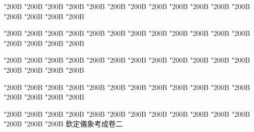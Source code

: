 \begin{正文}
\char"200B\relax{}
\char"200B\relax{}
\char"200B\relax{}
\char"200B\relax{}
\char"200B\relax{}
\char"200B\relax{}
\char"200B\relax{}
\char"200B\relax{}
\char"200B\relax{}
\char"200B\relax{}
\char"200B\relax{}
\char"200B\relax{}
\char"200B\relax{}
\char"200B\relax{}
\char"200B\relax{}
\char"200B\relax
{}\par
\end{正文}\clearpage
{}
\begin{正文}
\char"200B\relax{}
\char"200B\relax{}
\char"200B\relax{}
\char"200B\relax{}
\char"200B\relax{}
\char"200B\relax{}
\char"200B\relax{}
\char"200B\relax{}
\char"200B\relax{}
\char"200B\relax{}
\char"200B\relax{}
\char"200B\relax{}
\char"200B\relax{}
\char"200B\relax{}
\char"200B\relax{}
\char"200B\relax
{}\par
\end{正文}\clearpage
{}
\begin{正文}
\char"200B\relax{}
\char"200B\relax{}
\char"200B\relax{}
\char"200B\relax{}
\char"200B\relax{}
\char"200B\relax{}
\char"200B\relax{}
\char"200B\relax{}
\char"200B\relax{}
\char"200B\relax{}
\char"200B\relax{}
\char"200B\relax{}
\char"200B\relax{}
\char"200B\relax{}
\char"200B\relax{}
\char"200B\relax
{}\par
\end{正文}\clearpage
{}
\begin{正文}
\char"200B\relax{}
\char"200B\relax{}
\char"200B\relax{}
\char"200B\relax{}
\char"200B\relax{}
\char"200B\relax{}
\char"200B\relax{}
\char"200B\relax{}
\char"200B\relax{}
\char"200B\relax{}
\char"200B\relax{}
\char"200B\relax{}
\char"200B\relax{}
\char"200B\relax{}
\char"200B\relax{}
\char"200B\relax
{}\par
\end{正文}\clearpage
{}
\begin{正文}
\char"200B\relax{}
\char"200B\relax{}
\char"200B\relax{}
\char"200B\relax{}
\char"200B\relax{}
\char"200B\relax{}
\char"200B\relax{}
\char"200B\relax{}
\char"200B\relax{}
\char"200B\relax{}
\char"200B\relax{}
\char"200B\relax{}
\char"200B\relax{}
\char"200B\relax{}
\char"200B\relax{}
欽定儀象考成卷二
\par

\par\end{正文}\clearpage
